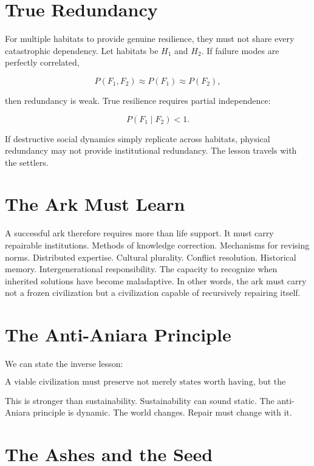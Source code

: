 \documentclass[11pt,oneside]{book}
\theoremstyle{definition}
\theoremstyle{remark}
\begin{document}
\section{True Redundancy}

For multiple habitats to provide genuine resilience, they must not share every catastrophic
dependency. Let habitats be \(H_1\) and \(H_2\). If failure modes are perfectly correlated,

\[
P(F_1,F_2) \approx P(F_1) \approx P(F_2),
\]

then redundancy is weak. True resilience requires partial independence:

\[
P(F_1\mid F_2) < 1.
\]

If destructive social dynamics simply replicate across habitats, physical redundancy may not provide
institutional redundancy. The lesson travels with the settlers.

\section{The Ark Must Learn}

A successful ark therefore requires more than life support. It must carry repairable institutions.
Methods of knowledge correction. Mechanisms for revising norms. Distributed expertise. Cultural
plurality. Conflict resolution. Historical memory. Intergenerational responsibility. The capacity to
recognize when inherited solutions have become maladaptive. In other words, the ark must carry not a
frozen civilization but a civilization capable of recursively repairing itself.

\section{The Anti-Aniara Principle}

We can state the inverse lesson:

\[
\boxed{ \text{A viable civilization must preserve not merely states worth having, but the capacity to diagnose, repair, revise, and reproduce the processes that make those states reachable.} }
\]

This is stronger than sustainability. Sustainability can sound static. The anti-Aniara principle is
dynamic. The world changes. Repair must change with it.

\section{The Ashes and the Seed}
\end{document}
